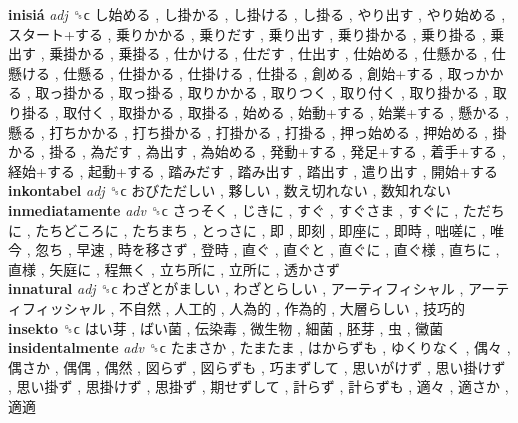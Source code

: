 \textbf{inisiá} \emph{adj}  ␝ϲ   し始める ,  し掛かる ,  し掛ける ,  し掛る ,  やり出す ,  やり始める ,  スタート+する ,  乗りかかる ,  乗りだす ,  乗り出す ,  乗り掛かる ,  乗り掛る ,  乗出す ,  乗掛かる ,  乗掛る ,  仕かける ,  仕だす ,  仕出す ,  仕始める ,  仕懸かる ,  仕懸ける ,  仕懸る ,  仕掛かる ,  仕掛ける ,  仕掛る ,  創める ,  創始+する ,  取っかかる ,  取っ掛かる ,  取っ掛る ,  取りかかる ,  取りつく ,  取り付く ,  取り掛かる ,  取り掛る ,  取付く ,  取掛かる ,  取掛る ,  始める ,  始動+する ,  始業+する ,  懸かる ,  懸る ,  打ちかかる ,  打ち掛かる ,  打掛かる ,  打掛る ,  押っ始める ,  押始める ,  掛かる ,  掛る ,  為だす ,  為出す ,  為始める ,  発動+する ,  発足+する ,  着手+する ,  経始+する ,  起動+する ,  踏みだす ,  踏み出す ,  踏出す ,  遣り出す ,  開始+する   \\
\textbf{inkontabel} \emph{adj}  ␝ϲ   おびただしい ,  夥しい ,  数え切れない ,  数知れない   \\
\textbf{inmediatamente} \emph{adv}  ␝ϲ   さっそく ,  じきに ,  すぐ ,  すぐさま ,  すぐに ,  ただちに ,  たちどころに ,  たちまち ,  とっさに ,  即 ,  即刻 ,  即座に ,  即時 ,  咄嗟に ,  唯今 ,  忽ち ,  早速 ,  時を移さず ,  登時 ,  直ぐ ,  直ぐと ,  直ぐに ,  直ぐ様 ,  直ちに ,  直様 ,  矢庭に ,  程無く ,  立ち所に ,  立所に ,  透かさず   \\
\textbf{innatural} \emph{adj}  ␝ϲ   わざとがましい ,  わざとらしい ,  アーティフィシャル ,  アーティフィッシャル ,  不自然 ,  人工的 ,  人為的 ,  作為的 ,  大層らしい ,  技巧的   \\
\textbf{insekto} ␝ϲ   はい芽 ,  ばい菌 ,  伝染毒 ,  微生物 ,  細菌 ,  胚芽 ,  虫 ,  黴菌   \\
\textbf{insidentalmente} \emph{adv}  ␝ϲ   たまさか ,  たまたま ,  はからずも ,  ゆくりなく ,  偶々 ,  偶さか ,  偶偶 ,  偶然 ,  図らず ,  図らずも ,  巧まずして ,  思いがけず ,  思い掛けず ,  思い掛ず ,  思掛けず ,  思掛ず ,  期せずして ,  計らず ,  計らずも ,  適々 ,  適さか ,  適適   \\
